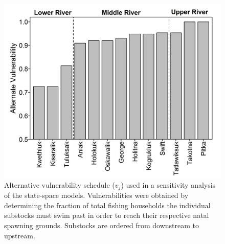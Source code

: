 \documentclass[12pt,]{book}
\theoremstyle{definition}
\theoremstyle{definition}
\theoremstyle{definition}
\theoremstyle{remark}
\begin{document}
\begin{figure}
  \centering
  \includegraphics{img/Ch4/alt-vuln-fig.jpg}
  \caption{Alternative vulnerability schedule ($v_j$) used in a sensitivity analysis of the state-space models. Vulnerabilities were obtained by determining the fraction of total fishing households the individual substocks must swim past in order to reach their respective natal spawning grounds. Substocks are ordered from downstream to upstream.}
  \label{fig:alt-vuln-fig}
\end{figure}

\clearpage
\end{document}
